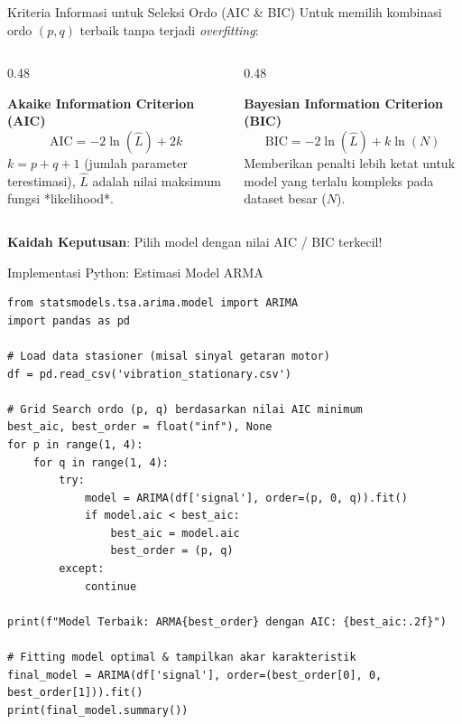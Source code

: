 \documentclass[aspectratio=169, 10pt]{beamer}
\begin{document}
\begin{frame}{Kriteria Informasi untuk Seleksi Ordo (AIC \& BIC)}
    Untuk memilih kombinasi ordo $(p, q)$ terbaik tanpa terjadi \textit{overfitting}:
    \begin{columns}[T]
        \begin{column}{0.48\textwidth}
            \begin{block}{\textbf{Akaike Information Criterion (AIC)}}
                \begin{equation}
                    \text{AIC} = -2\ln(\hat{L}) + 2k
                \end{equation}
                $k = p + q + 1$ (jumlah parameter terestimasi), $\hat{L}$ adalah nilai maksimum fungsi *likelihood*.
            \end{block}
        \end{column}
        \begin{column}{0.48\textwidth}
            \begin{block}{\textbf{Bayesian Information Criterion (BIC)}}
                \begin{equation}
                    \text{BIC} = -2\ln(\hat{L}) + k\ln(N)
                \end{equation}
                Memberikan penalti lebih ketat untuk model yang terlalu kompleks pada dataset besar ($N$).
            \end{block}
        \end{column}
    \end{columns}
    \vspace{0.2cm}
    \begin{center}
        \textbf{Kaidah Keputusan}: Pilih model dengan nilai AIC / BIC terkecil!
    \end{center}
\end{frame}

\begin{frame}[fragile]{Implementasi Python: Estimasi Model ARMA}
\begin{lstlisting}
from statsmodels.tsa.arima.model import ARIMA
import pandas as pd

# Load data stasioner (misal sinyal getaran motor)
df = pd.read_csv('vibration_stationary.csv')

# Grid Search ordo (p, q) berdasarkan nilai AIC minimum
best_aic, best_order = float("inf"), None
for p in range(1, 4):
    for q in range(1, 4):
        try:
            model = ARIMA(df['signal'], order=(p, 0, q)).fit()
            if model.aic < best_aic:
                best_aic = model.aic
                best_order = (p, q)
        except:
            continue

print(f"Model Terbaik: ARMA{best_order} dengan AIC: {best_aic:.2f}")

# Fitting model optimal & tampilkan akar karakteristik
final_model = ARIMA(df['signal'], order=(best_order[0], 0, best_order[1])).fit()
print(final_model.summary())
\end{lstlisting}
\end{frame}
\end{document}

